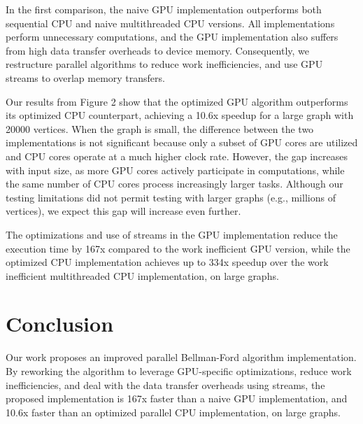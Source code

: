 \documentclass[11pt,a4paper, final, twoside]{article}
\theoremstyle{proposition}
\theoremstyle{definition}
\theoremstyle{remark}
\numberwithin{equation}{section}
\begin{document}
\newpage
In the first comparison, the naive GPU implementation outperforms both sequential CPU and naive multithreaded CPU versions. All implementations perform unnecessary computations, and the GPU implementation also suffers from high data transfer overheads to device memory. Consequently, we restructure parallel algorithms to reduce work inefficiencies, and use GPU streams to overlap memory transfers.

Our results from Figure 2 show that the optimized GPU algorithm outperforms its optimized CPU counterpart, achieving a 10.6x speedup for a large graph with 20000 vertices. When the graph is small, the difference between the two implementations is not significant because only a subset of GPU cores are utilized and CPU cores operate at a much higher clock rate. However, the gap increases with input size, as more GPU cores actively participate in computations, while the same number of CPU cores process increasingly larger tasks. Although our testing limitations did not permit testing with larger graphs (e.g., millions of vertices), we expect this gap will increase even further.

The optimizations and use of streams in the GPU implementation reduce the execution time by 167x compared to the work inefficient GPU version, while the optimized CPU implementation achieves up to 334x speedup over the work inefficient multithreaded CPU implementation, on large graphs.
\section{Conclusion}
Our work proposes an improved parallel Bellman-Ford algorithm implementation. By reworking the algorithm to leverage GPU-specific optimizations, reduce work inefficiencies, and deal with the data transfer overheads using streams, the proposed implementation is 167x faster than a naive GPU implementation, and 10.6x faster than an optimized parallel CPU implementation, on large graphs.





\end{document}
